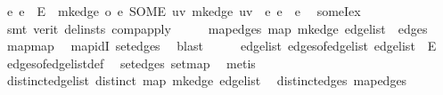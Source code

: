 \begin{isabellebody}
\ {\isachardoublequoteopen}{\isasymAnd}e{\isachardot}{\kern0pt}\ e\ {\isasymin}\ E\ {\isasymLongrightarrow}\ {\isacharparenleft}{\kern0pt}mk{\isacharunderscore}{\kern0pt}edge\ o\ {\isacharparenleft}{\kern0pt}{\isasymlambda}e{\isachardot}{\kern0pt}\ SOME\ uv{\isachardot}{\kern0pt}\ mk{\isacharunderscore}{\kern0pt}edge\ uv\ {\isacharequal}{\kern0pt}\ e{\isacharparenright}{\kern0pt}{\isacharparenright}{\kern0pt}\ e\ {\isacharequal}{\kern0pt}\ e{\isachardoublequoteclose}\ \isamarkupfalse%
\ someI{\isacharunderscore}{\kern0pt}ex\isanewline
\ \ \ \ \isamarkupfalse%
\ {\isacharparenleft}{\kern0pt}smt\ {\isacharparenleft}{\kern0pt}verit{\isacharcomma}{\kern0pt}\ del{\isacharunderscore}{\kern0pt}insts{\isacharparenright}{\kern0pt}\ comp{\isacharunderscore}{\kern0pt}apply{\isacharparenright}{\kern0pt}\isanewline
\ \ \isamarkupfalse%
\ \isamarkupfalse%
\ map{\isacharunderscore}{\kern0pt}edges{\isacharcolon}{\kern0pt}\ {\isachardoublequoteopen}map\ mk{\isacharunderscore}{\kern0pt}edge\ {\isacharquery}{\kern0pt}edge{\isacharunderscore}{\kern0pt}list\ {\isacharequal}{\kern0pt}\ edges{\isachardoublequoteclose}\ \isamarkupfalse%
\ map{\isacharunderscore}{\kern0pt}map\ \isamarkupfalse%
\ map{\isacharunderscore}{\kern0pt}idI\ set{\isacharunderscore}{\kern0pt}edges\ \isamarkupfalse%
\ blast\isanewline
\ \ \isamarkupfalse%
\ \isamarkupfalse%
\ edge{\isacharunderscore}{\kern0pt}list{\isacharcolon}{\kern0pt}\ {\isachardoublequoteopen}edges{\isacharunderscore}{\kern0pt}of{\isacharunderscore}{\kern0pt}edge{\isacharunderscore}{\kern0pt}list\ {\isacharquery}{\kern0pt}edge{\isacharunderscore}{\kern0pt}list\ {\isacharequal}{\kern0pt}\ E{\isachardoublequoteclose}\ \isamarkupfalse%
\ edges{\isacharunderscore}{\kern0pt}of{\isacharunderscore}{\kern0pt}edge{\isacharunderscore}{\kern0pt}list{\isacharunderscore}{\kern0pt}def\ \isamarkupfalse%
\ set{\isacharunderscore}{\kern0pt}edges\ set{\isacharunderscore}{\kern0pt}map\ \isamarkupfalse%
\ metis\isanewline
\ \ \isamarkupfalse%
\ distinct{\isacharunderscore}{\kern0pt}edge{\isacharunderscore}{\kern0pt}list{\isacharcolon}{\kern0pt}\ {\isachardoublequoteopen}distinct\ {\isacharparenleft}{\kern0pt}map\ mk{\isacharunderscore}{\kern0pt}edge\ {\isacharquery}{\kern0pt}edge{\isacharunderscore}{\kern0pt}list{\isacharparenright}{\kern0pt}{\isachardoublequoteclose}\ \isamarkupfalse%
\ distinct{\isacharunderscore}{\kern0pt}edges\ map{\isacharunderscore}{\kern0pt}edges\ \isamarkupfalse%

\end{isabellebody}
